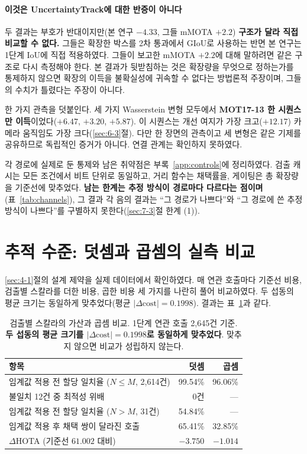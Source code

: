 \documentclass[12pt,a4paper,oneside]{report}
\begin{document}
\paragraph{이것은 UncertaintyTrack에 대한 반증이 아니다} 두 결과는 부호가 반대이지만(본 연구 $-4.33$, 그들 mMOTA $+2.2$) \textbf{구조가 달라 직접 비교할 수 없다.} 그들은 확장한 박스를 2차 통과에서 GIoU로 사용하는 반면 본 연구는 1단계 IoU에 직접 적용하였다. 그들이 보고한 mMOTA $+2.2$에 대해 말하려면 같은 구조로 다시 측정해야 한다. 본 결과가 뒷받침하는 것은 확장량을 무엇으로 정하는가를 통제하지 않으면 확장의 이득을 불확실성에 귀속할 수 없다는 방법론적 주장이며, 그들의 수치가 틀렸다는 주장이 아니다.

한 가지 관측을 덧붙인다. 세 가지 Wasserstein 변형 모두에서 \textbf{MOT17-13 한 시퀀스만 이득}이었다($+6.47$, $+3.20$, $+5.87$). 이 시퀀스는 개선 여지가 가장 크고($+12.17$) 카메라 움직임도 가장 크다(\ref{sec:6-3}절). 다만 한 장면의 관측이고 세 변형은 같은 기제를 공유하므로 독립적인 증거가 아니다. 연결 관계는 확인하지 못하였다.

각 경로에 실제로 둔 통제와 남은 취약점은 부록~\ref{app:controls}에 정리하였다. 검출 캐시는 모든 조건에서 비트 단위로 동일하고, 거리 함수는 채택률을, 게이팅은 총 확장량을 기준선에 맞추었다. \textbf{남는 한계는 추정 방식이 경로마다 다르다는 점이며}(표~\ref{tab:channels}), 그 결과 각 음의 결과는 ``그 경로가 나쁘다''와 ``그 경로에 쓴 추정 방식이 나쁘다''를 구별하지 못한다(\ref{sec:7-3}절 한계 (1)).

\section{추적 수준: 덧셈과 곱셈의 실측 비교}\label{sec:5-5}

\ref{sec:4-1}절의 설계 제약을 실제 데이터에서 확인하였다. 매 연관 호출마다 기준선 비용, 검출별 스칼라를 더한 비용, 곱한 비용 세 가지를 나란히 풀어 비교하였다. 두 섭동의 평균 크기는 동일하게 맞추었다(평균 $|\Delta \mathrm{cost}| = 0.1998$). 결과는 표~\ref{tab:addmul}과 같다.

\begin{table}[htbp]
\centering
\small
\caption{검출별 스칼라의 가산과 곱셈 비교. 1단계 연관 호출 2{,}645건 기준. \textbf{두 섭동의 평균 크기를 $|\Delta \mathrm{cost}| = 0.1998$로 동일하게 맞추었다}. 맞추지 않으면 비교가 성립하지 않는다.}
\label{tab:addmul}
\begin{tabular}{lrr}
\toprule
항목 & 덧셈 & 곱셈 \\
\midrule
임계값 적용 전 할당 일치율 ($N \le M$, 2{,}614건) & 99.54\% & 96.06\% \\
\quad 불일치 12건 중 최적성 위배 & 0건 & --- \\
임계값 적용 전 할당 일치율 ($N > M$, 31건) & 54.84\% & --- \\
임계값 적용 후 채택 쌍이 달라진 호출 & 65.41\% & 32.85\% \\
$\Delta$HOTA (기준선 $61.002$ 대비) & $-3.750$ & $-1.014$ \\
\bottomrule
\end{tabular}
\end{table}
\end{document}
